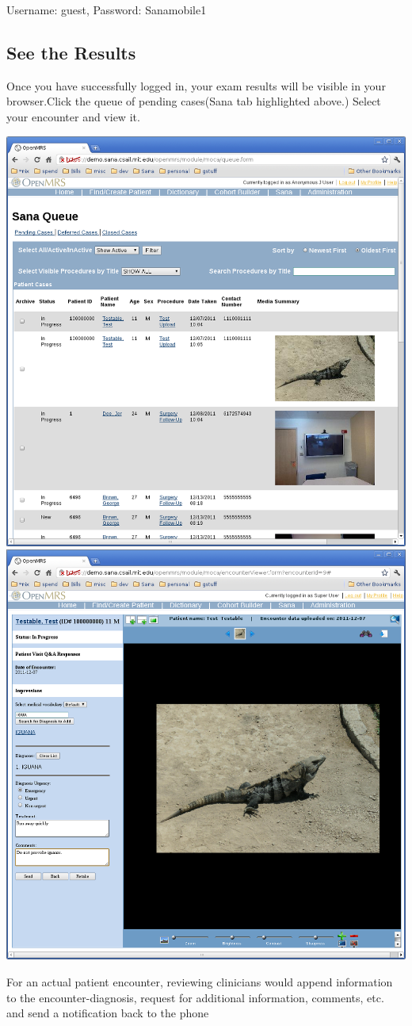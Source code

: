 \documentclass[a4paper,10pt]{article}
\begin{document}
Username: guest, Password: Sanamobile1

\subsection{See the Results}
\noindent Once you have successfully logged in, your exam results will be 
visible in your browser.Click the queue of pending cases(Sana tab highlighted 
above.) Select your encounter and view it.

\includegraphics[scale=0.25,keepaspectratio=true]{openmrs_sana_queue.png}
\includegraphics[scale=0.25,keepaspectratio=true]{openmrs_sana_encounter.png}

For an actual patient encounter, reviewing clinicians would append information 
to the encounter-diagnosis, request for additional information, comments, etc.
and send a notification back to the phone
\end{document}
